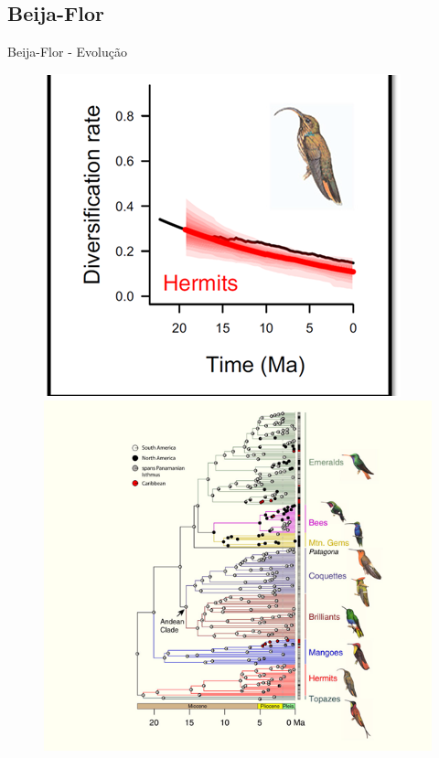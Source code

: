 \documentclass{beamer}
\begin{document}
\subsection{Beija-Flor}
    \begin{frame}{Beija-Flor - Evolução}
        \begin{figure}[!h]
          \centering
          \includegraphics[scale=0.28]{bf-timepng.png} \quad
  	      \includegraphics[scale=0.75]{bf_geneal.png}
          \label{Rotulo}
        \end{figure}    
    \end{frame}
    
\end{document}

